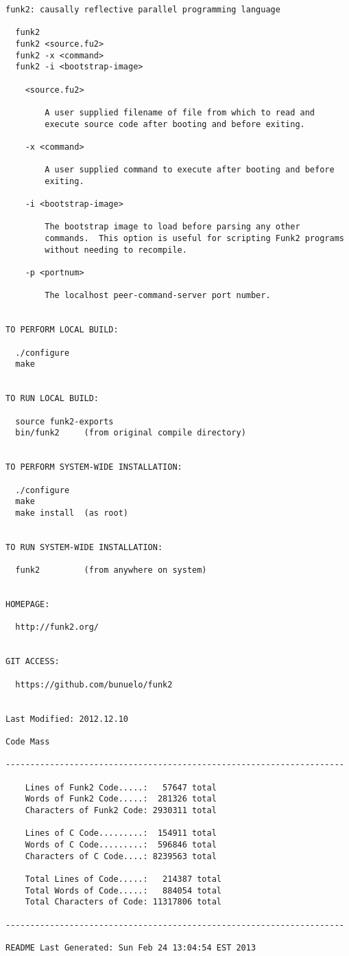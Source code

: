 \begin{lstlisting}
funk2: causally reflective parallel programming language

  funk2
  funk2 <source.fu2>
  funk2 -x <command>
  funk2 -i <bootstrap-image>

    <source.fu2>

        A user supplied filename of file from which to read and
        execute source code after booting and before exiting.

    -x <command>

        A user supplied command to execute after booting and before
        exiting.

    -i <bootstrap-image>

        The bootstrap image to load before parsing any other
        commands.  This option is useful for scripting Funk2 programs
        without needing to recompile.

    -p <portnum>

        The localhost peer-command-server port number.


TO PERFORM LOCAL BUILD:

  ./configure
  make


TO RUN LOCAL BUILD:

  source funk2-exports
  bin/funk2     (from original compile directory)


TO PERFORM SYSTEM-WIDE INSTALLATION:

  ./configure
  make
  make install  (as root)


TO RUN SYSTEM-WIDE INSTALLATION:

  funk2         (from anywhere on system)


HOMEPAGE:

  http://funk2.org/


GIT ACCESS:

  https://github.com/bunuelo/funk2


Last Modified: 2012.12.10

Code Mass

---------------------------------------------------------------------

    Lines of Funk2 Code.....:   57647 total
    Words of Funk2 Code.....:  281326 total
    Characters of Funk2 Code: 2930311 total

    Lines of C Code.........:  154911 total
    Words of C Code.........:  596846 total
    Characters of C Code....: 8239563 total

    Total Lines of Code.....:   214387 total
    Total Words of Code.....:   884054 total
    Total Characters of Code: 11317806 total

---------------------------------------------------------------------

README Last Generated: Sun Feb 24 13:04:54 EST 2013
\end{lstlisting}

